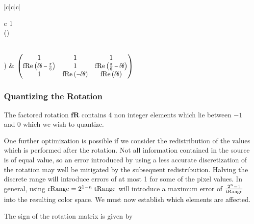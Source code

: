 \begin{tabular}{|c|c|c|}
\begin{array}{c}
 1 \\
 \cos (\theta ) \\
 \um{} \\
\end{array}
\!\!\!\right)\)   & \( \left(\!\!\!
\begin{array}{ccc}
 1 & 1 & 1 \\
 \fReq{\delta \theta -\frac{\pi }{6}} & 1 & \fReq{\frac{\pi }{6}-\delta \theta } \\
 1 & \fReq{-\delta \theta } & \fReq{\delta \theta } \\
\end{array}
\!\!\!\right)  \)  \\ 
\hline 
\end{tabular} 

\subsubsection{Quantizing the Rotation}

The factored rotation $\mathbf{fR}$ contains 4 non integer elements which lie between $-1$ and $0$ which we wish to quantize. 
 

One further optimization is possible if we consider the redistribution of the values which is performed after the rotation. Not all information contained in the source is of equal value, so an error introduced by using a less accurate discretization of the rotation may well be mitigated by the subsequent redistribution. Halving the discrete range will introduce errors of at most 1 for some of the pixel values. In general, using $\text{rRange} = 2^{1-n} \; \text{tRange}$ will introduce a maximum error of $\frac{2^n -1}{\text{tRange}}$ into the resulting color space. We must now establish which elements are affected.

The sign of the rotation matrix is given by

